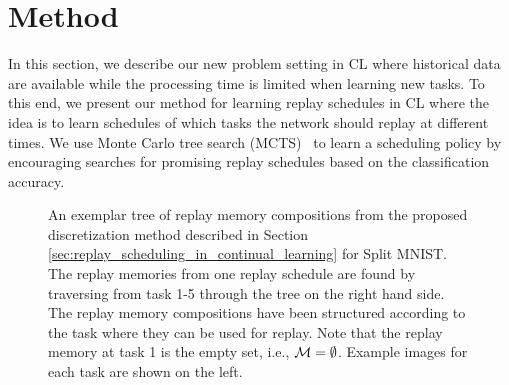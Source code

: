 
\section{Method}\label{paperC:sec:method}


In this section, we describe our new problem setting in CL where historical data are available while the processing time is limited when learning new tasks. To this end, we present our method for learning replay schedules in CL where the idea is to learn schedules of which tasks the network should replay at different times. 
We use Monte Carlo tree search (MCTS)~ to learn a scheduling policy by encouraging searches for promising replay schedules based on the classification accuracy. 



\begin{figure*}[t]
\centering 
\setlength{\figwidth}{.77\textwidth}
\setlength{\figheight}{.3\textheight}

\vspace{-2mm}
\caption{An exemplar tree of replay memory compositions from the proposed discretization method described in Section \ref{sec:replay_scheduling_in_continual_learning} for Split MNIST. The replay memories from one replay schedule are found by traversing from task 1-5 through the tree on the right hand side. The replay memory compositions have been structured according to the task where they can be used for replay. Note that the replay memory at task 1 is the empty set, i.e., ${\mathcal{M}} = \emptyset$. Example images for each task are shown on the left.
}
\vspace{-3mm}
\label{fig:replay_scheduling_mcts_tree_example}
\end{figure*}










